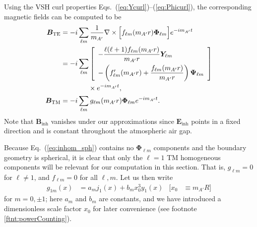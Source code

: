 \documentclass[amsmath,amssymb,aps,10pt,prd,letterpaper,nofootinbib,balancelastpage,notitlepage,superscriptaddress,twocolumn,floatfix]{revtex4-2}
\renewcommand{\eqref}[2][]{Eq{#1}.~(\ref{eq:#2})}	%
\newcommand{\eqrefRange}[2]{Eqs.~(\ref{eq:#1})--(\ref{eq:#2})}
\newcommand{\lb}{\ensuremath{\left}}					%
\newcommand{\rb}{\ensuremath{\right}}					%
\newcommand{\nl}{\nonumber \\ & \quad }					%
\begin{document}
Using the VSH curl properties \eqrefRange{Ycurl}{Phicurl}, the corresponding magnetic fields can be computed to be
\begin{align}\label{eq:BTE}
    \bm B_\text{TE}&=-i\sum_{\ell m}\frac1{m_{A'}}\nabla\times\Big[f_{\ell m}(m_{A'}r)\bm\Phi_{\ell m}\Big]e^{-im_{A'}t}\nonumber\\&=-i\sum_{\ell m}\lb[\begin{array}{l}-\dfrac{\ell(\ell+1)f_{\ell m}(m_{A'}r)}{m_{A'}r}\bm Y_{\ell m}\\[2ex]-\left(f'_{\ell m}(m_{A'}r)+\dfrac{f_{\ell m}(m_{A'}r)}{m_{A'}r}\right)\bm\Psi_{\ell m}\end{array}\rb]\nl\qquad\quad \times e^{-im_{A'}t},\\
    \bm B_\text{TM}&=-i\sum_{\ell m}g_{\ell m}(m_{A'}r)\bm\Phi_{\ell m}e^{-im_{A'}t}.
    \label{eq:BTM}
\end{align}
Note that $\bm B_\text{inh}$ vanishes under our approximations since $\bm E_\text{inh}$ points in a fixed direction and is constant throughout the atmospheric air gap. 

Because \eqref{inhom_sph} contains no $\bm{\Phi}_{\ell m}$ components and the boundary geometry is spherical, it is clear that only the $\ell=1$ TM homogeneous components will be relevant for our computation in this section.
That is, $g_{\ell m}=0$ for $\ell\neq1$, and $f_{\ell m}=0$ for all $\ell,m$.
Let us then write
\begin{align}
    g_{1m}(x)&=a_mj_1(x)+b_m x_0^3 y_1(x) &
    [x_0 &\equiv m_{A'}R]
    \label{eq:fmDefn}
\end{align}
for $m=0,\pm1$; here $a_m$ and $b_m$ are constants, and we have introduced a dimensionless scale factor $x_0$ for later convenience (see footnote \ref{ftnt:powerCounting}).
\end{document}
